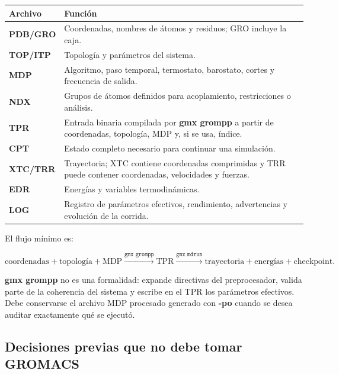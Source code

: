 \documentclass[
  spanish,
  11pt,
  a4paper]{article}
\newcounter{none} %
\begin{document}
{\def\LTcaptype{none} %
\begin{longtable}[]{@{}
  >{\raggedright\arraybackslash}p{}
  >{\raggedright\arraybackslash}p{}@{}}
\toprule\noalign{}
\begin{minipage}[b]{\linewidth}\raggedright
Archivo
\end{minipage} & \begin{minipage}[b]{\linewidth}\raggedright
Función
\end{minipage} \\
\midrule\noalign{}
\endhead
\bottomrule\noalign{}
\endlastfoot
\textbf{PDB/GRO} & Coordenadas, nombres de átomos y residuos; GRO
incluye la caja. \\
\textbf{TOP/ITP} & Topología y parámetros del sistema. \\
\textbf{MDP} & Algoritmo, paso temporal, termostato, barostato, cortes y
frecuencia de salida. \\
\textbf{NDX} & Grupos de átomos definidos para acoplamiento,
restricciones o análisis. \\
\textbf{TPR} & Entrada binaria compilada por \textbf{gmx grompp} a
partir de coordenadas, topología, MDP y, si se usa, índice. \\
\textbf{CPT} & Estado completo necesario para continuar una
simulación. \\
\textbf{XTC/TRR} & Trayectoria; XTC contiene coordenadas comprimidas y
TRR puede contener coordenadas, velocidades y fuerzas. \\
\textbf{EDR} & Energías y variables termodinámicas. \\
\textbf{LOG} & Registro de parámetros efectivos, rendimiento,
advertencias y evolución de la corrida. \\
\end{longtable}
}

El flujo mínimo es:

\[
\text{coordenadas}+\text{topología}+\text{MDP}
\xrightarrow{\texttt{gmx grompp}}
\text{TPR}
\xrightarrow{\texttt{gmx mdrun}}
\text{trayectoria}+\text{energías}+\text{checkpoint}.
\]

\textbf{gmx grompp} no es una formalidad: expande directivas del
preprocesador, valida parte de la coherencia del sistema y escribe en el
TPR los parámetros efectivos. Debe conservarse el archivo MDP procesado
generado con \textbf{-po} cuando se desea auditar exactamente qué se
ejecutó.

\subsection{Decisiones previas que no debe tomar
GROMACS}\label{decisiones-previas-que-no-debe-tomar-gromacs}
\end{document}
